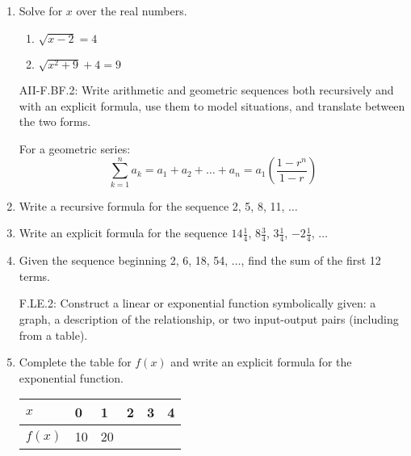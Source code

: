 \documentclass[12pt, twoside]{article}
\begin{document}
\begin{enumerate}[itemsep=0.5cm]
\item Solve for $x$ over the real numbers.
    \begin{multicols}{2}
    \begin{enumerate}[itemsep=0.5cm]
        \item $\sqrt{x-2}=4$
        \item $\sqrt{x^2+9} + 4 = 9$
    \end{enumerate}
    \end{multicols}

\newpage
AII-F.BF.2: Write arithmetic and geometric sequences both recursively and with an explicit formula, use them to model situations, and translate between the two forms.

For a geometric series:
$$\sum_{k=1}^{n} a_k = a_1 + a_2 + \ldots + a_n = a_1 \left( \frac{1-r^n}{1-r} \right)$$

\item Write a recursive formula for the sequence 2, 5, 8, 11, $\ldots$ \vspace{3cm}

\item Write an explicit formula for the sequence $14 \frac{1}{4}$, $8 \frac{3}{4}$, $3 \frac{1}{4}$, $-2 \frac{1}{4}$, $\ldots$ \vspace{3cm}


\item Given the sequence beginning  2, 6, 18, 54, $\ldots$, find the sum of the first 12 terms. \vspace{3cm}

F.LE.2: Construct a linear or exponential function symbolically given: a graph, a description of the relationship, or two input-output pairs (including from a table).
\item Complete the table for $f(x)$ and write an explicit formula for the exponential function.
    \begin{center}
    \begin{tabular}{|p{1cm}|p{1cm}|p{1cm}|p{1cm}|p{1cm}|p{1cm}|}
        \hline
        $x$ & 0 & 1 & 2 & 3 & 4 \\
        \hline
        $f(x)$ & 10 & 20 & & & \\[0.25cm]
        \hline
    \end{tabular}
    \end{center}


\end{enumerate}
\end{document}
